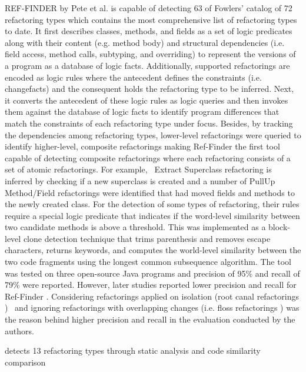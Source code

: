 \documentclass[letterpaper,12pt,onecolumn,final]{report}
\begin{document}
REF-FINDER \cite{Kim2010} by Pete et al. \cite{Prete2010} is capable of detecting 63 of Fowlers' catalog \cite{Fowler1999} of 72 refactoring types which contains the most comprehensive list of refactoring types to date. It first describes classes, methods, and fields as a set of logic predicates along with their content (e.g. method body) and structural dependencies (i.e. field access, method calls, subtyping, and overriding) to represent the versions of a program as a database of logic facts. Additionally, supported refactorings are encoded as logic rules where the antecedent defines the constraints (i.e. changefacts) and the consequent holds the refactoring type to be inferred. Next, it converts the antecedent of these logic rules as logic queries and then invokes them against the database of logic facts to identify program differences that match the constraints of each refactoring type under focus. Besides, by tracking the dependencies among refactoring types, lower-level refactorings were queried to identify higher-level, composite refactorings making Ref-Finder the first tool capable of detecting composite refactorings where each refactoring consists of a set of atomic refactorings. For example,  Extract Superclass refactoring is inferred by checking if a new superclass is created and a number of PullUp Method/Field refactorings were identified that had moved fields and methods to the newly created class. For the detection of some types of refactoring, their rules require a special logic predicate that indicates if the word-level similarity between two candidate methods is above a threshold. This was implemented as a block-level clone detection technique that trims parenthesis and removes escape characters, returns keywords, and computes the world-level similarity between the two code fragments using the longest common subsequence algorithm. The tool was tested on three open-source Java programs and precision of 95\% and recall of 79\% were reported. However, later studies reported lower precision and recall for Ref-Finder \cite{Soares2013} \cite{Silva2017} \cite{Tan2019}. Considering refactorings applied on isolation (root canal refactorings \cite{MurphyHill2012})  and ignoring refactorings with overlapping changes (i.e. floss refactorings \cite{MurphyHill2012}) was the reason behind higher precision and recall in the evaluation conducted by the authors.

 detects 13
refactoring types through static analysis and code similarity
comparison
\end{document}
